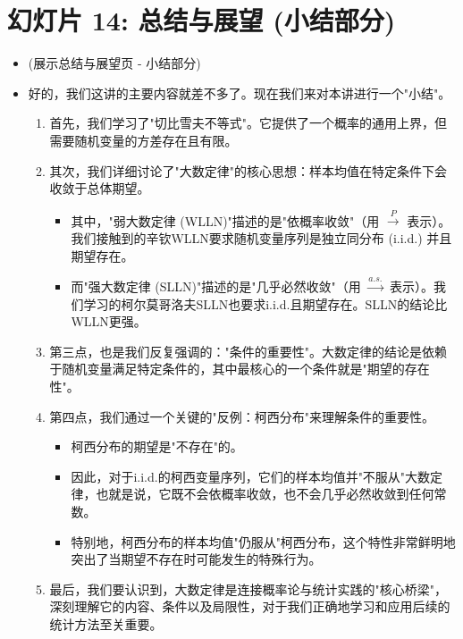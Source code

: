 \documentclass[UTF8]{article} %
\begin{document}
\section*{幻灯片 14: 总结与展望 (小结部分)}
\begin{itemize}
    \itemsep1em
    \item (展示总结与展望页 - 小结部分)
    \item 好的，我们这讲的主要内容就差不多了。现在我们来对本讲进行一个"小结"。
    \begin{enumerate}[label=\arabic*., itemsep=0.5em]
        \item 首先，我们学习了"切比雪夫不等式"。它提供了一个概率的通用上界，但需要随机变量的方差存在且有限。
        \item 其次，我们详细讨论了"大数定律"的核心思想：样本均值在特定条件下会收敛于总体期望。
            \begin{itemize}[label=\textbullet, itemsep=0.2em]
                \item 其中，"弱大数定律 (WLLN)"描述的是"依概率收敛"（用 $\xrightarrow{P}$ 表示）。我们接触到的辛钦WLLN要求随机变量序列是独立同分布 (i.i.d.) 并且期望存在。
                \item 而"强大数定律 (SLLN)"描述的是"几乎必然收敛"（用 $\xrightarrow{a.s.}$ 表示）。我们学习的柯尔莫哥洛夫SLLN也要求i.i.d.且期望存在。SLLN的结论比WLLN更强。
            \end{itemize}
        \item 第三点，也是我们反复强调的："条件的重要性"。大数定律的结论是依赖于随机变量满足特定条件的，其中最核心的一个条件就是"期望的存在性"。
        \item 第四点，我们通过一个关键的"反例：柯西分布"来理解条件的重要性。
            \begin{itemize}[label=\textbullet, itemsep=0.2em]
                \item 柯西分布的期望是"不存在"的。
                \item 因此，对于i.i.d.的柯西变量序列，它们的样本均值并"不服从"大数定律，也就是说，它既不会依概率收敛，也不会几乎必然收敛到任何常数。
                \item 特别地，柯西分布的样本均值"仍服从"柯西分布，这个特性非常鲜明地突出了当期望不存在时可能发生的特殊行为。
            \end{itemize}
        \item 最后，我们要认识到，大数定律是连接概率论与统计实践的"核心桥梁"，深刻理解它的内容、条件以及局限性，对于我们正确地学习和应用后续的统计方法至关重要。
    \end{enumerate}
\end{itemize}
\end{document}
